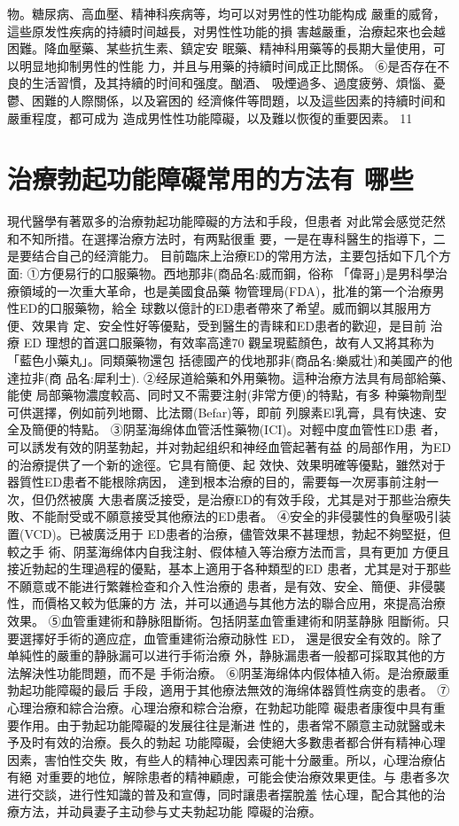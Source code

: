 \documentclass[12pt,UTF8]{ctexbook}
\begin{document}
物。糖尿病、高血壓、精神科疾病等，均可以对男性的性功能构成
嚴重的威脅，這些原发性疾病的持續时间越長，对男性性功能的損
害越嚴重，治療起來也会越困難。降血壓藥、某些抗生素、鎮定安
眠藥、精神科用藥等的長期大量使用，可以明显地抑制男性的性能
力，并且与用藥的持續时间成正比關係。
⑥是否存在不良的生活習慣，及其持續的时间和强度。酗酒、
吸煙過多、過度疲勞、煩惱、憂鬱、困難的人際關係，以及窘困的
经濟條件等問題，以及這些因素的持續时间和嚴重程度，都可成为
造成男性性功能障礙，以及難以恢復的重要因素。
11\section{治療勃起功能障礙常用的方法有
哪些}
現代醫學有著眾多的治療勃起功能障礙的方法和手段，但患者
对此常会感觉茫然和不知所措。在選擇治療方法时，有两點很重
要，一是在專科醫生的指導下，二是要结合自己的经濟能力。
目前臨床上治療ED的常用方法，主要包括如下几个方面:
①方便易行的口服藥物。西地那非(商品名:威而鋼，俗称
「偉哥」)是男科學治療領域的一次重大革命，也是美國食品藥
物管理局(FDA)，批准的第一个治療男性ED的口服藥物，給全
球數以億計的ED患者帶來了希望。威而鋼以其服用方便、效果肯
定、安全性好等優點，受到醫生的青睐和ED患者的歡迎，是目前
治療 ED 理想的首選口服藥物，有效率高達70%
觀呈現藍顏色，故有人又將其称为「藍色小藥丸」。同類藥物還包
括德國产的伐地那非(商品名:樂威壮)和美國产的他達拉非(商
品名:犀利士).
②经尿道給藥和外用藥物。這种治療方法具有局部給藥、能使
局部藥物濃度較高、同时又不需要注射(非常方便)的特點，有多
种藥物劑型可供選擇，例如前列地爾、比法爾(Befar)等，即前
列腺素El乳膏，具有快速、安全及簡便的特點。
③阴茎海绵体血管活性藥物(ICI)。对輕中度血管性ED患
者，可以誘发有效的阴茎勃起，并对勃起组织和神经血管起著有益
的局部作用，为ED的治療提供了一个新的途徑。它具有簡便、起
效快、效果明確等優點，雖然对于器質性ED患者不能根除病因，
達到根本治療的目的，需要每一次房事前注射一次，但仍然被廣
大患者廣泛接受，是治療ED的有效手段，尤其是对于那些治療失
敗、不能耐受或不願意接受其他療法的ED患者。
④安全的非侵襲性的負壓吸引装置(VCD)。已被廣泛用于
ED患者的治療，儘管效果不甚理想，勃起不夠堅挺，但較之手
術、阴茎海绵体内自我注射、假体植入等治療方法而言，具有更加
方便且接近勃起的生理過程的優點，基本上適用于各种類型的ED
患者，尤其是对于那些不願意或不能进行繁雜检查和介入性治療的
患者，是有效、安全、簡便、非侵襲性，而價格又較为低廉的方
法，并可以通過与其他方法的聯合应用，來提高治療效果。
⑤血管重建術和静脉阻斷術。包括阴茎血管重建術和阴茎静脉
阻斷術。只要選擇好手術的適应症，血管重建術治療动脉性 ED，
還是很安全有效的。除了单純性的嚴重的静脉漏可以进行手術治療
外，静脉漏患者一般都可採取其他的方法解決性功能問題，而不是
手術治療。
⑥阴茎海绵体内假体植入術。是治療嚴重勃起功能障礙的最后
手段，適用于其他療法無效的海绵体器質性病变的患者。
⑦心理治療和綜合治療。心理治療和粽合治療，在勃起功能障
礙患者康復中具有重要作用。由于勃起功能障礙的发展往往是漸进
性的，患者常不願意主动就醫或未予及时有效的治療。長久的勃起
功能障礙，会使絕大多數患者都合併有精神心理因素，害怕性交失
敗，有些人的精神心理因素可能十分嚴重。所以，心理治療佔有絕
对重要的地位，解除患者的精神顧慮，可能会使治療效果更佳。与
患者多次进行交談，进行性知識的普及和宣傳，同时讓患者摆脫羞
怯心理，配合其他的治療方法，并动員妻子主动參与丈夫勃起功能
障礙的治療。
\end{document}
